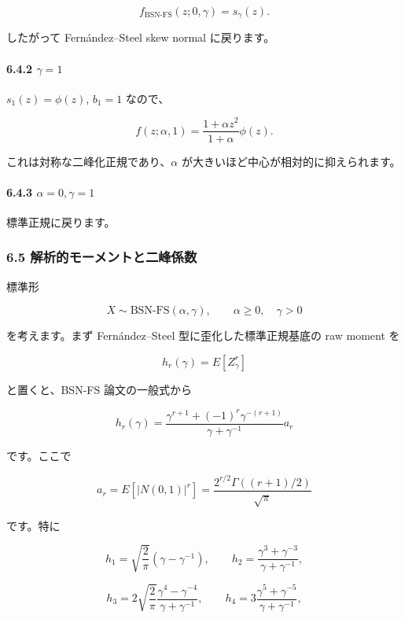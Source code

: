 \documentclass[
]{article}
\begin{document}
\[
f_{\mathrm{BSN\text{-}FS}}(z;0,\gamma)=s_\gamma(z).
\]

したがって Fernández--Steel skew normal に戻ります。

\hypertarget{gamma1}{%
\paragraph{\texorpdfstring{6.4.2
\(\gamma=1\)}{6.4.2 \textbackslash gamma=1}}\label{gamma1}}

\(s_1(z)=\phi(z)\), \(b_1=1\) なので、

\[
f(z;\alpha,1)=\frac{1+\alpha z^2}{1+\alpha}\phi(z).
\]

これは対称な二峰化正規であり、\(\alpha\)
が大きいほど中心が相対的に抑えられます。

\hypertarget{alpha0gamma1}{%
\paragraph{\texorpdfstring{6.4.3
\(\alpha=0,\gamma=1\)}{6.4.3 \textbackslash alpha=0,\textbackslash gamma=1}}\label{alpha0gamma1}}

標準正規に戻ります。

\hypertarget{ux89e3ux6790ux7684ux30e2ux30fcux30e1ux30f3ux30c8ux3068ux4e8cux5cf0ux4fc2ux6570}{%
\subsubsection{6.5
解析的モーメントと二峰係数}\label{ux89e3ux6790ux7684ux30e2ux30fcux30e1ux30f3ux30c8ux3068ux4e8cux5cf0ux4fc2ux6570}}

標準形

\[
X\sim\mathrm{BSN\text{-}FS}(\alpha,\gamma),
\qquad
\alpha\ge0,\quad \gamma>0
\]

を考えます。まず Fernández--Steel 型に歪化した標準正規基底の raw moment
を

\[
h_r(\gamma)=E[Z_\gamma^r]
\]

と置くと、BSN-FS 論文の一般式から

\[
h_r(\gamma)
=
\frac{\gamma^{r+1}+(-1)^r\gamma^{-(r+1)}}
{\gamma+\gamma^{-1}}a_r
\]

です。ここで

\[
a_r=E[|N(0,1)|^r]
=\frac{2^{r/2}\Gamma((r+1)/2)}{\sqrt{\pi}}
\]

です。特に

\[
h_1=\sqrt{\frac2\pi}(\gamma-\gamma^{-1}),
\qquad
h_2=\frac{\gamma^3+\gamma^{-3}}{\gamma+\gamma^{-1}},
\]

\[
h_3=2\sqrt{\frac2\pi}
\frac{\gamma^4-\gamma^{-4}}{\gamma+\gamma^{-1}},
\qquad
h_4=3\frac{\gamma^5+\gamma^{-5}}{\gamma+\gamma^{-1}},
\]
\end{document}
